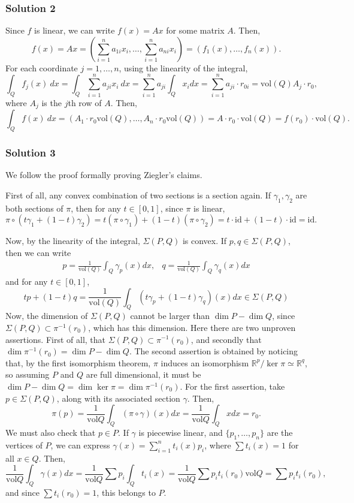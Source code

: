 \documentclass[12pt,a4paper]{article}
\newcommand{\RR}{\mathbb{R}}
\newcommand{\vol}{\text{vol}}
\begin{document}
\subsubsection*{Solution 2}
Since $f$ is linear, we can write $f(x)=Ax$ for some matrix $A$. Then,
\[ f(x) = Ax = \left( \sum_{i=1}^{n} a_{1i}x_i, \dots, \sum_{i=1}^{n} a_{ni}x_i \right) = (f_1(x), \dots, f_n(x)). \]
For each coordinate $j=1,\dots,n$, using the linearity of the integral, 
\[ \int_{Q}^{} f_j(x) \ dx = \int_{Q} \sum_{i=1}^{n} a_{ji}x_i \ dx = \sum_{i=1}^{n} a_{ji} \int_{Q} x_i dx = \sum_{i=1}^{n} a_{ji} \cdot r_{0i} = \text{vol}(Q)  A_j \cdot r_0, \]
where $A_j$  is the $j$th row of $A$. Then, 
\[ \int_{Q}^{} f(x) \ dx = (A_1\cdot r_0 \text{vol}(Q), \dots, A_n\cdot r_0 \text{vol}(Q)) = A \cdot r_0 \cdot \text{vol}(Q) = f(r_0) \cdot \text{vol}(Q). \]
\subsubsection*{Solution 3}

We follow the proof formally proving Ziegler's claims. 

First of all, any convex combination of two sections is a section again.
If $\gamma_1, \gamma_2$ are both sections of $\pi$, then for any $t\in [0,1]$, since $\pi$ is linear,
$$\pi \circ (t\gamma_1+(1-t)\gamma_2)= t(\pi\circ \gamma_1) + (1-t)(\pi \circ \gamma_2) = t\cdot \text{id}+(1-t)\cdot\text{id}=\text{id}.$$

Now, by the linearity of the integral, $\Sigma(P,Q)$ is convex. 
If $p,q\in \Sigma(P,Q)$, then we can write
$$
\begin{array}{cc}
 p=\frac{1}{\text{vol}(Q)}\int_Q \gamma_p(x) dx, & q=\frac{1}{\text{vol}(Q)}\int_Q \gamma_q(x) dx
\end{array}
$$
and for any $t\in[0,1]$, 
$$tp+(1-t)q = \frac{1}{\text{vol}(Q)}\int_Q (t\gamma_p + (1-t)\gamma_q)(x) dx \in \Sigma(P,Q)$$
Now, the dimension of $\Sigma(P,Q)$ cannot be larger than $\dim P - \dim Q$, since $\Sigma(P,Q)\subset \pi^{-1}(r_0)$, which has this dimension. Here there are two unproven assertions.
First of all, that $\Sigma(P,Q)\subset \pi^{-1}(r_0)$, and secondly that $\dim \pi^{-1}(r_0)=\dim P - \dim Q$. 
The second assertion is obtained by noticing that, by the first isomorphism theorem, $\pi$ induces an isomorphism $\RR^p/\ker \pi \simeq \RR^q$, so assuming $P$ and $Q$ are full dimensional, it must be $\dim P - \dim Q = \dim \ker \pi = \dim \pi^{-1}(r_0)$. 
For the first assertion, take $p\in \Sigma(P,Q)$, along with its associated section $\gamma$. 
Then, 
$$\pi(p)=\frac{1}{\vol Q} \int_Q (\pi \circ \gamma)(x) dx = \frac{1}{\vol Q} \int_Q x dx =r_0.$$
We must also check that $p\in P$. If $\gamma$ is piecewise linear, and $\{p_1,\dots,p_n\}$ are the vertices of $P$, we can express $\gamma(x)=\sum_{i=1}^n t_i(x)p_i$, where $\sum t_i(x)=1$ for all $x\in Q$. Then, 
$$\frac{1}{\vol Q}\int_Q \gamma(x)dx=\frac{1}{\vol Q}\sum p_i\int_Q t_i(x)=\frac{1}{\vol Q}\sum p_i t_i(r_0)\vol Q = \sum p_i t_i(r_0),$$
and since $\sum t_i(r_0)=1$, this belongs to $P$.
\end{document}
